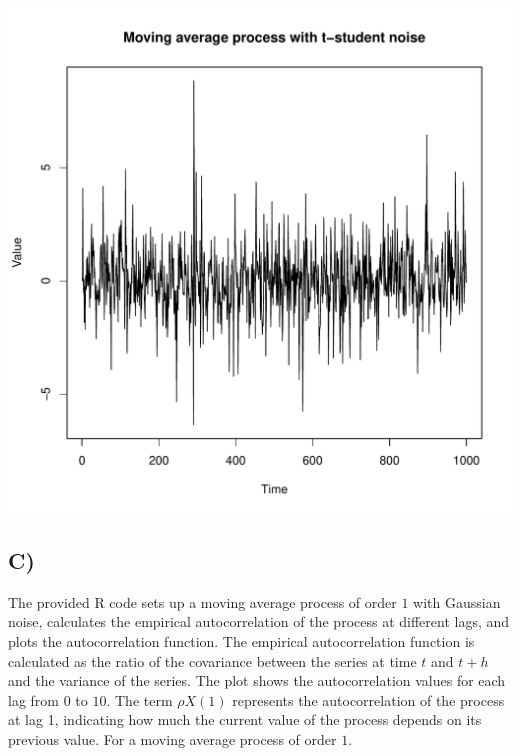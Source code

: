 \documentclass[11pt, letterpaper]{article}
\begin{document}
\begin{file}[q4b.r]
	
\end{file}

\begin{center}
	\includegraphics[scale=0.47]{code/q4b}
\end{center}
\newpage
\subsection*{C)}

\begin{file}[q4c.r]
	
\end{file}

The provided R code sets up a moving average process of order $1$ with Gaussian
noise, calculates the empirical autocorrelation of the process at different
lags, and plots the autocorrelation function. The
empirical autocorrelation function is calculated as the ratio of the covariance
between the series at time $t$ and $t + h$ and the variance of the series. The
plot
shows the autocorrelation values for each lag from $0$ to $10$. The term $\rho
	X(1)$
represents the autocorrelation of the process at lag 1, indicating how much the
current value of the process depends on its previous value. For a moving
average process of order $1$.
\end{document}

